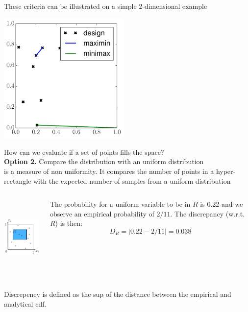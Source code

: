 \begin{frame}{}
These criteria can be illustrated on a simple 2-dimensional example
\begin{center}
\includegraphics[height=6.5cm]{2_Design_of_experiments/figures/python/spf_minimaxmaximin}
\end{center}
\end{frame}

\begin{frame}{}
How can we evaluate if a set of points fills the space?\\ \vspace{2mm}
\textbf{Option 2.} Compare the distribution with an uniform distribution\\ \vspace{2mm}
 is a measure of non uniformity. It compares the number of points in a hyper-rectangle with the expected number of samples from a uniform distribution
\vspace{-2mm}
\begin{columns}[c]
\column{4cm}
\begin{center}
\includegraphics[height=4cm]{2_Design_of_experiments/figures/latexdraw/discrepency}
\end{center}
\column{6cm}
\vspace{1mm}
The probability for a uniform variable to be in $R$ is 0.22 and we observe an empirical probability of $2/11$. The discrepancy (w.r.t. $R$) is then:
$$D_R = |0.22-2/11| = 0.038$$
\end{columns}
\vspace{2mm}
Discrepency is defined as the sup of the distance between the empirical and analytical cdf.
\end{frame}

